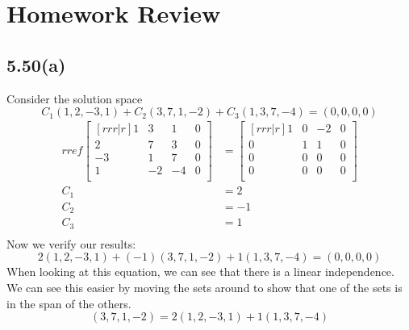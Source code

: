 \documentclass{report}
\theoremstyle{plain}
\theoremstyle{definition}
\theoremstyle{plain}
\begin{document}
\section{Homework Review}
\subsection{5.50(a)}
Consider the solution space
\[ C_1(1,2,-3,1) + C_2(3,7,1,-2)+C_3(1,3,7,-4) = (0,0,0,0) \]
\begin{align*}
rref
\begin{bmatrix}[rrr|r]
1&3&1&0\\2&7&3&0\\-3&1&7&0\\1&-2&-4&0\\ \end{bmatrix}
&= \begin{bmatrix}[rrr|r]
1&0&-2&0\\ 0&1&1&0\\0&0&0&0\\0&0&0&0\\ \end{bmatrix}\\
C_1 &= 2\\ C_2 &= -1\\ C_3 &= 1\\
\end{align*}
Now we verify our results:
\[ 2(1,2,-3,1)+(-1)(3,7,1,-2)+1(1,3,7,-4) = (0,0,0,0) \]
When looking at this equation, we can see that there is a linear independence. We can see this easier by moving the sets around to show that one of the sets is in the span of the others.
\[ (3,7,1,-2) = 2(1,2,-3,1)+1(1,3,7,-4) \]
\end{document}
